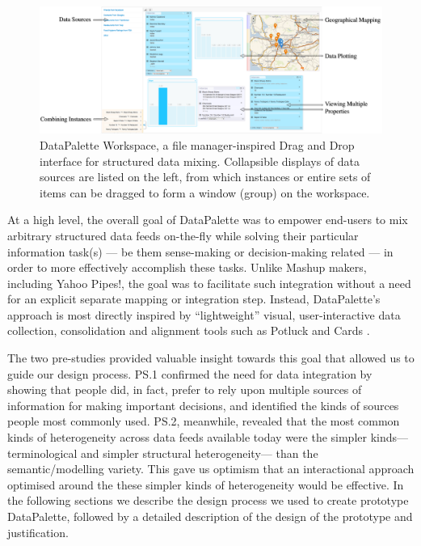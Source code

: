 \documentclass{sigchi}
\begin{document}
\begin{figure}[tbp]
\begin{center}
\includegraphics[width=18cm]{img/screenshot}
\caption{DataPalette Workspace, a file manager-inspired Drag and Drop interface for structured data mixing. Collapsible displays of data sources are listed on the left, from which instances or entire sets of items can be dragged to form a window (group) on the workspace.}
\label{fig:workspace}
\end{center}
\end{figure}

At a high level, the overall goal of DataPalette was to empower end-users to mix arbitrary structured data feeds on-the-fly while solving their particular information task(s) --- be them sense-making or decision-making related --- in order to more effectively accomplish these tasks.  Unlike Mashup makers, including Yahoo Pipes!, the goal was to facilitate such integration without a need for an explicit separate mapping or integration step.  Instead, DataPalette's approach is most directly inspired by ``lightweight'' visual, user-interactive data collection, consolidation and alignment tools such as Potluck \cite{citeulike:3875264} and Cards \cite{Dontcheva:2007:RCS:1294211.1294224}.

The two pre-studies provided valuable insight towards this goal that allowed us to guide our design process. PS.1 confirmed the need for data integration by showing that people did, in fact, prefer to rely upon multiple sources of information for making important decisions, and identified the kinds of sources people most commonly used.  PS.2, meanwhile, revealed that the most common kinds of heterogeneity across data feeds available today were the simpler kinds---terminological and simpler structural heterogeneity--- than the semantic/modelling variety. This gave us optimism that an interactional approach optimised around the these simpler kinds of heterogeneity would be effective.  In the following sections we describe the design process we used to create prototype DataPalette, followed by a detailed description of the design of the prototype and justification.
\end{document}
